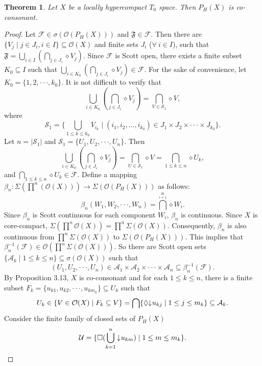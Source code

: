 \documentclass[preprint,12pt]{elsarticle}
\numberwithin{equation}{section}
\newtheorem{theorem}{Theorem}[section]
\newcommand{\dn}{\mathord{\downarrow}\hspace{0.05em}}
\begin{document}
\begin{theorem} Let $X$ be a locally hypercompact $T_{0}$ space. Then $P_{H}(X)$ is co-consonant.
\end{theorem}
\setlength{\baselineskip}{1.1\baselineskip}
\begin{proof}Let $\mathcal{F}\in\sigma(\mathcal{O}(P_{H}(X)))$ and $\mathfrak{F}\in\mathcal{F}$. Then there are $\{V_{j}\mid j\in J_{i},i\in I\}\subseteq\mathcal{O}(X)$ and  finite sets $J_{i}$ ($\forall\ i\in I$), such that $\mathfrak{F}=\bigcup\limits_{i\in I}(\bigcap\limits_{j\in J_{i}}\diamond V_{j})$. Since $\mathcal{F}$ is Scott open, there exists a finite subset $K_{0}\subseteq I$ such that $\bigcup\limits_{i\in K_{0}}(\bigcap\limits_{j\in J_{i}}\diamond V_{j})\in\mathcal{F}$. For the sake of convenience, let $K_{0}=\{1,2,\cdot\cdot\cdot,k_{0}\}$. It is not difficult to verify that $$\bigcup\limits_{i\in K_{0}}(\bigcap\limits_{j\in J_{i}}\diamond V_{j})=\bigcap\limits_{V\in\mathcal{S}_{1}}\diamond V,$$ where $$
\mathcal{S}_{1}=\{\bigcup\limits_{1\leq k\leq k_{0}}V_{i_{k}}\mid (i_{1},i_{2},...,i_{k_{0}})\in J_{1}\times J_{2}\times\cdot\cdot\cdot\times J_{k_{0}}\}.$$
 Let $n=|\mathcal{S}_{1}|$ and $\mathcal{S}_{1}=\{U_{1},U_{2},\cdot\cdot\cdot,U_{n}\}$. Then $$\bigcup\limits_{i\in K_{0}}(\bigcap\limits_{j\in J_{i}}\diamond V_{j})=\bigcap\limits_{U\in\mathcal{S}_{1}}\diamond V=\bigcap\limits_{1\leq k\leq n}\diamond U_{k},$$  and $\bigcap\limits_{1\leq k\leq n}\diamond U_{k}\in\mathcal{F}$.
Define a mapping $\beta_{n}:\Sigma(\prod\limits^{n}(\mathcal{O}(X)))\longrightarrow\Sigma(\mathcal{O}(P_{H}(X)))$ as follows:
$$\beta_{n}(W_{1}, W_{2},\cdot\cdot\cdot,W_{n})=\bigcap\limits^{n}\limits_{i=1}\diamond W_{i}.$$
Since $\beta_{n}$ is Scott continuous for each component $W_{i}$, $\beta_{n}$ is continuous. Since $X$ is core-compact, $\Sigma(\prod\limits^{n}\mathcal{O}(X))=\prod\limits^{n}\Sigma(\mathcal{O}(X))$. Consequently, $\beta_{n}$ is also continuous from $\prod\limits^{n}\Sigma(\mathcal{O}(X))$ to $\Sigma(\mathcal{O}(P_{H}(X)))$. This implies that $\beta_{n}^{-1}(\mathcal{F})\in\mathcal{O}(\prod\limits^{n}\Sigma(\mathcal{O}(X)))$.  So there are Scott open sets $\{\mathcal{A}_{k}\mid 1\leq k\leq n\}\subseteq\sigma(\mathcal{O}(X))$ such that
$$(U_{1},U_{2},\cdot\cdot\cdot, U_{n})\in\mathcal{A}_{1}\times\mathcal{A}_{2}\times\cdot\cdot\cdot\times\mathcal{A}_{n}\subseteq\beta_{n}^{-1}(\mathcal{F}).$$ By Proposition 3.13, $X$ is co-consonant and for each $1\leq k\leq n$, there is a finite subset  $F_{k}=\{u_{k1},u_{k2},\cdot\cdot\cdot,u_{km_{k}}\}\subseteq U_{k}$ such that $$U_{k}\in\{V\in\mathcal{O}(X)\mid F_{k}\subseteq V\}=\bigcap\{\lozenge \dn u_{kj}\mid 1\leq j\leq m_{k}\}\subseteq\mathcal{A}_{k}.$$ Consider the finite family of closed sets of $P_{H}(X)$ $$\mathcal{U}=\{\Box(\bigcup\limits^{n}\limits_{k=1}\dn u_{km})\mid 1\leq m\leq m_{k}\}.$$



\end{proof}
\end{document}
